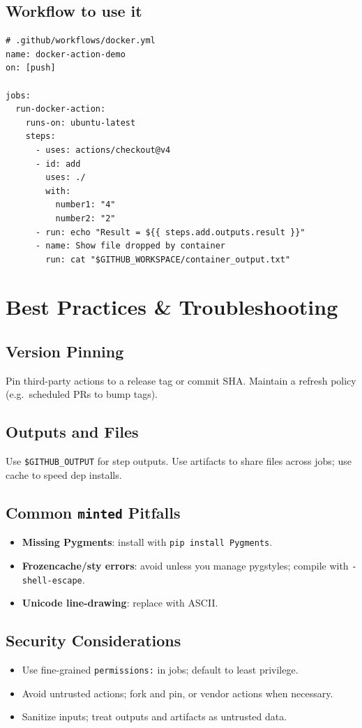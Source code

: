 \documentclass[11pt]{article}
\begin{document}
\subsection*{Workflow to use it}
\begin{verbatim}
# .github/workflows/docker.yml
name: docker-action-demo
on: [push]

jobs:
  run-docker-action:
    runs-on: ubuntu-latest
    steps:
      - uses: actions/checkout@v4
      - id: add
        uses: ./
        with:
          number1: "4"
          number2: "2"
      - run: echo "Result = ${{ steps.add.outputs.result }}"
      - name: Show file dropped by container
        run: cat "$GITHUB_WORKSPACE/container_output.txt"
\end{verbatim}

\section{Best Practices \& Troubleshooting}
\subsection*{Version Pinning}
Pin third-party actions to a release tag or commit SHA. Maintain a refresh policy (e.g.\ scheduled PRs to bump tags).

\subsection*{Outputs and Files}
Use \texttt{\$GITHUB\_OUTPUT} for step outputs. Use artifacts to share files across jobs; use cache to speed dep installs.

\subsection*{Common \texttt{minted} Pitfalls}
\begin{itemize}
  \item \textbf{Missing Pygments}: install with \texttt{pip install Pygments}.
  \item \textbf{Frozencache/sty errors}: avoid \texttt{} unless you manage pygstyles; compile with \texttt{-shell-escape}.
  \item \textbf{Unicode line-drawing}: replace with ASCII.
\end{itemize}

\subsection*{Security Considerations}
\begin{itemize}
  \item Use fine-grained \texttt{permissions:} in jobs; default to least privilege.
  \item Avoid untrusted actions; fork and pin, or vendor actions when necessary.
  \item Sanitize inputs; treat outputs and artifacts as untrusted data.
\end{itemize}
\end{document}
